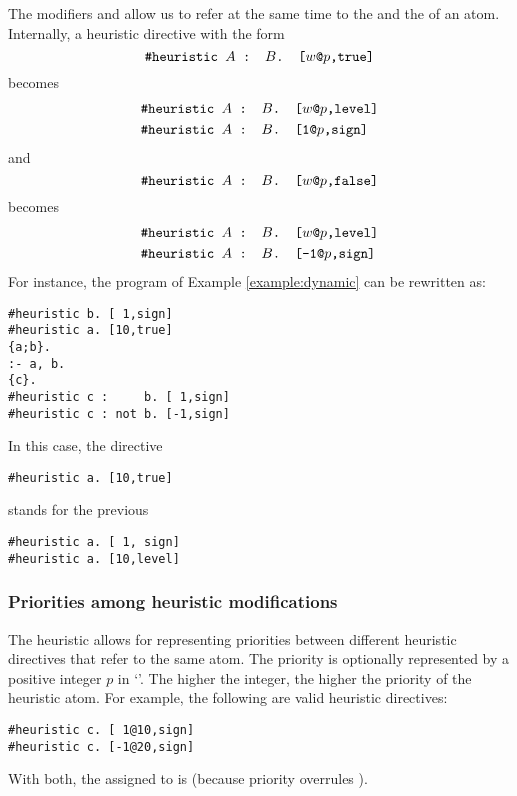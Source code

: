 The modifiers  and  allow us 
to refer at the same time to the  and the  of an atom.
Internally, a heuristic directive with the form 
\[\texttt{\#heuristic }A\texttt{ : }B\texttt{. [}w\texttt{@}p\texttt{,}\texttt{true]}\]
becomes
\begin{align*}
\texttt{\#heuristic }A\texttt{ : }B\texttt{. [}&w\texttt{@}p\texttt{,}\texttt{level]}\\
\texttt{\#heuristic }A\texttt{ : }B\texttt{. [}&\texttt{1}\texttt{@}p\texttt{,}\texttt{sign]}
\end{align*}
and 
\[\texttt{\#heuristic }A\texttt{ : }B\texttt{. [}w\texttt{@}p\texttt{,}\texttt{false]}\]
becomes
\begin{align*}
\texttt{\#heuristic }A\texttt{ : }B\texttt{. [}&w\texttt{@}p\texttt{,}\texttt{level]}\\
\texttt{\#heuristic }A\texttt{ : }B\texttt{. [}&\texttt{-1}\texttt{@}p\texttt{,}\texttt{sign]}
\end{align*}
%
For instance, the program of Example \ref{example:dynamic}
can be rewritten as:
\begin{lstlisting}[numbers=none]
#heuristic b. [ 1,sign]
#heuristic a. [10,true]
{a;b}.
:- a, b.
{c}.
#heuristic c :     b. [ 1,sign]
#heuristic c : not b. [-1,sign]
\end{lstlisting}
In this case, the directive 
\begin{lstlisting}[numbers=none]
#heuristic a. [10,true]
\end{lstlisting}
stands for the previous
\begin{lstlisting}[numbers=none]
#heuristic a. [ 1, sign]
#heuristic a. [10,level]
\end{lstlisting}

\subsubsection{Priorities among heuristic modifications}

The  heuristic allows for representing priorities
between different heuristic directives that refer to the same atom.
The priority is optionally represented by a positive integer $p$ in `'.
The higher the integer, the higher the priority of the heuristic atom.
For example, the following are valid heuristic directives:
\begin{lstlisting}[numbers=none]
#heuristic c. [ 1@10,sign]
#heuristic c. [-1@20,sign]
\end{lstlisting}
With both, the  assigned to  is  
(because priority  overrules ).  

